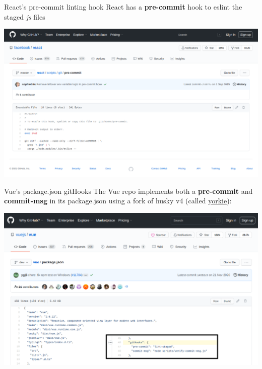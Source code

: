 \documentclass[11pt]{beamer}
\begin{document}
\begin{frame}{React's pre-commit linting hook}
  React has a \textbf{pre-commit} hook to eslint the staged \textit{js} files
  \begin{center}
   \href{https://github.com/facebook/react/blob/master/scripts/git/pre-commit}{
      \includegraphics[scale=0.2]{react-pre-commit.png}
   }
  \end{center}
\end{frame}


\begin{frame}{Vue's package.json gitHooks}
  The Vue repo implements both a \textbf{pre-commit} and \textbf{commit-msg} in its package.json using a fork of husky v4 (called 
  {\color{purple} \href{https://github.com/yyx990803/yorkie}{yorkie}}): 

  \begin{center}
   \href{https://github.com/vuejs/vue/blob/dev/package.json\#L46}{
      \includegraphics[scale=0.2]{vue-githooks.png}
   }
  \end{center}
\end{frame}
\end{document}
